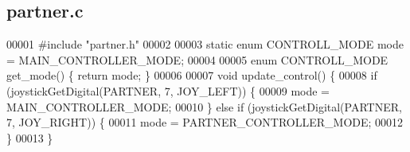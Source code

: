 \subsection{partner.\+c}
\label{partner_8c_source}

\begin{DoxyCode}
00001 \textcolor{preprocessor}{#include "partner.h"}
00002 
00003 \textcolor{keyword}{static} \textcolor{keyword}{enum} CONTROLL_MODE mode = MAIN_CONTROLLER_MODE;
00004 
00005 \textcolor{keyword}{enum} CONTROLL_MODE get_mode() \{ \textcolor{keywordflow}{return} mode; \}
00006 
00007 \textcolor{keywordtype}{void} update_control() \{
00008   \textcolor{keywordflow}{if} (joystickGetDigital(PARTNER, 7, JOY\_LEFT)) \{
00009     mode = MAIN_CONTROLLER_MODE;
00010   \} \textcolor{keywordflow}{else} \textcolor{keywordflow}{if} (joystickGetDigital(PARTNER, 7, JOY\_RIGHT)) \{
00011     mode = PARTNER_CONTROLLER_MODE;
00012   \}
00013 \}
\end{DoxyCode}
